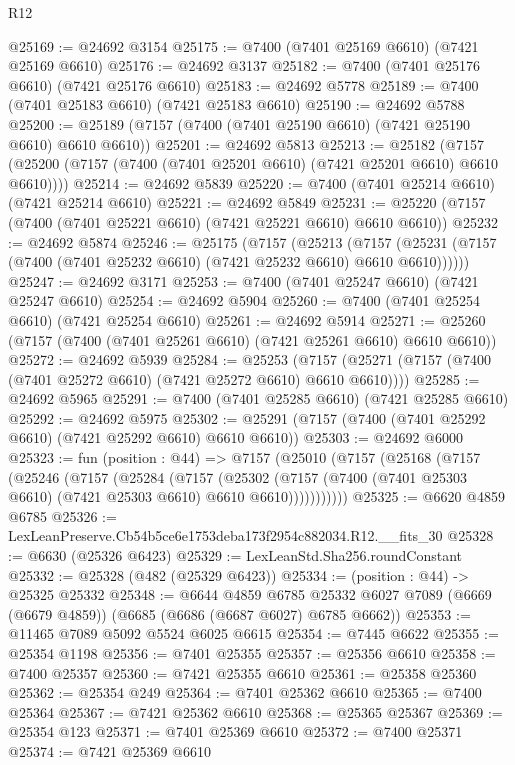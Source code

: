 \begin{lexlean}{R12}
\begin{coremodule}
@25169 := @24692 @3154
@25175 := @7400 (@7401 @25169 @6610) (@7421 @25169 @6610)
@25176 := @24692 @3137
@25182 := @7400 (@7401 @25176 @6610) (@7421 @25176 @6610)
@25183 := @24692 @5778
@25189 := @7400 (@7401 @25183 @6610) (@7421 @25183 @6610)
@25190 := @24692 @5788
@25200 := @25189 (@7157 (@7400 (@7401 @25190 @6610) (@7421 @25190 @6610) @6610 @6610))
@25201 := @24692 @5813
@25213 := @25182
    (@7157 (@25200 (@7157 (@7400 (@7401 @25201 @6610) (@7421 @25201 @6610) @6610 @6610))))
@25214 := @24692 @5839
@25220 := @7400 (@7401 @25214 @6610) (@7421 @25214 @6610)
@25221 := @24692 @5849
@25231 := @25220 (@7157 (@7400 (@7401 @25221 @6610) (@7421 @25221 @6610) @6610 @6610))
@25232 := @24692 @5874
@25246 := @25175
    (@7157
      (@25213
        (@7157 (@25231 (@7157 (@7400 (@7401 @25232 @6610) (@7421 @25232 @6610) @6610 @6610))))))
@25247 := @24692 @3171
@25253 := @7400 (@7401 @25247 @6610) (@7421 @25247 @6610)
@25254 := @24692 @5904
@25260 := @7400 (@7401 @25254 @6610) (@7421 @25254 @6610)
@25261 := @24692 @5914
@25271 := @25260 (@7157 (@7400 (@7401 @25261 @6610) (@7421 @25261 @6610) @6610 @6610))
@25272 := @24692 @5939
@25284 := @25253
    (@7157 (@25271 (@7157 (@7400 (@7401 @25272 @6610) (@7421 @25272 @6610) @6610 @6610))))
@25285 := @24692 @5965
@25291 := @7400 (@7401 @25285 @6610) (@7421 @25285 @6610)
@25292 := @24692 @5975
@25302 := @25291 (@7157 (@7400 (@7401 @25292 @6610) (@7421 @25292 @6610) @6610 @6610))
@25303 := @24692 @6000
@25323 := fun (position : @44) =>
  @7157
    (@25010
      (@7157
        (@25168
          (@7157
            (@25246
              (@7157
                (@25284
                  (@7157
                    (@25302
                      (@7157 (@7400 (@7401 @25303 @6610) (@7421 @25303 @6610) @6610 @6610)))))))))))
@25325 := @6620 @4859 @6785
@25326 := LexLeanPreserve.Cb54b5ce6e1753deba173f2954c882034.R12.__fits_30
@25328 := @6630 (@25326 @6423)
@25329 := LexLeanStd.Sha256.roundConstant
@25332 := @25328 (@482 (@25329 @6423))
@25334 := (position : @44) -> @25325 @25332
@25348 := @6644
    @4859
    @6785
    @25332
    @6027
    @7089
    (@6669 (@6679 @4859))
    (@6685 (@6686 (@6687 @6027) @6785 @6662))
@25353 := @11465 @7089 @5092 @5524 @6025 @6615
@25354 := @7445 @6622
@25355 := @25354 @1198
@25356 := @7401 @25355
@25357 := @25356 @6610
@25358 := @7400 @25357
@25360 := @7421 @25355 @6610
@25361 := @25358 @25360
@25362 := @25354 @249
@25364 := @7401 @25362 @6610
@25365 := @7400 @25364
@25367 := @7421 @25362 @6610
@25368 := @25365 @25367
@25369 := @25354 @123
@25371 := @7401 @25369 @6610
@25372 := @7400 @25371
@25374 := @7421 @25369 @6610

\end{coremodule}
\end{lexlean}
